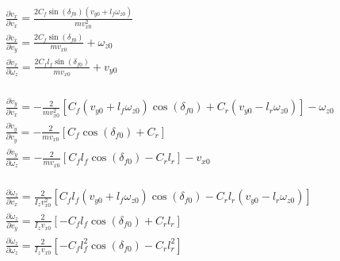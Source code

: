 \documentclass[12pt]{article}
\begin{document}
        
        $\begin{aligned}
            & \frac{\partial \dot{v}_x}{\partial v_x} = \frac{2 C_f \sin(\delta_{f0}) (v_{y0} + l_f \omega_{z0})}{m v_{x0}^2} \\
            & \frac{\partial \dot{v}_x}{\partial v_y} = \frac{2 C_f \sin(\delta_{f0})}{m v_{x0}} + \omega_{z0} \\
            & \frac{\partial \dot{v}_x}{\partial \omega_z} = \frac{2 C_f l_f \sin(\delta_{f0})}{m v_{x0}} + v_{y0} \\
        \end{aligned}$

        $\begin{aligned}
            & \frac{\partial \dot{v}_y}{\partial v_x} = -\frac{2}{m v_{x0}^2} \left[ C_f (v_{y0} + l_f \omega_{z0}) \cos(\delta_{f0}) + C_r (v_{y0} - l_r \omega_{z0}) \right] - \omega_{z0} \\
            & \frac{\partial \dot{v}_y}{\partial v_y} = -\frac{2}{m v_{x0}} \left[ C_f \cos(\delta_{f0}) + C_r \right]   \\
            & \frac{\partial \dot{v}_y}{\partial \omega_z} = -\frac{2}{m v_{x0}} \left[ C_f l_f \cos(\delta_{f0}) - C_r l_r \right]  - v_{x0} \\ 
        \end{aligned}$

        $\begin{aligned}
            & \frac{\partial \dot{\omega}_z}{\partial v_x} = \frac{2}{I_z v_{x0}^2} \left[ C_f l_f(v_{y0} + l_f \omega_{z0})\cos(\delta_{f0}) - C_r l_r(v_{y0} - l_r \omega_{z0}) \right]  \\ %
            & \frac{\partial \dot{\omega}_z}{\partial v_y} = \frac{2}{I_z v_{x0}} \left[ - C_f l_f \cos(\delta_{f0}) + C_r l_r \right]  \\ %
            & \frac{\partial \dot{\omega}_z}{\partial \omega_z} = \frac{2}{I_z v_{x0}} \left[ - C_f l_f^2 \cos(\delta_{f0}) - C_r l_r^2 \right]  \\ %
        \end{aligned}$
\end{document}
